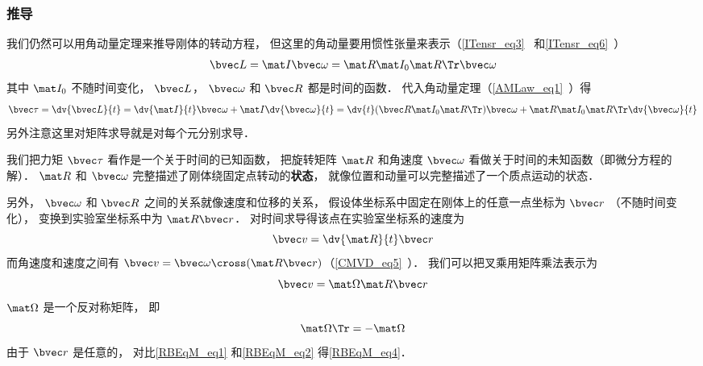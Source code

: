 \subsubsection{推导}
我们仍然可以用角动量定理来推导刚体的转动方程， 但这里的角动量要用惯性张量来表示（\autoref{ITensr_eq3}~ 和\autoref{ITensr_eq6}~）
\begin{equation}
\bvec L = \mat I \bvec \omega = \mat R \mat I_0 \mat R\Tr \bvec \omega
\end{equation}
其中 $\mat I_0$ 不随时间变化， $\bvec L$， $\bvec \omega$ 和 $\bvec R$ 都是时间的函数． 代入角动量定理（\autoref{AMLaw_eq1}~）得
\begin{equation}\label{RBEqM_eq3}
\bvec \tau = \dv{\bvec L}{t} = \dv{\mat I}{t} \bvec\omega + \mat I \dv{\bvec\omega}{t}
= \dv{t} (\bvec R\mat I_0 \mat R\Tr) \bvec \omega + \mat R \mat I_0 \mat R\Tr \dv{\bvec \omega}{t}
\end{equation}
另外注意这里对矩阵求导就是对每个元分别求导．

我们把力矩 $\bvec \tau$ 看作是一个关于时间的已知函数， 把旋转矩阵 $\mat R$ 和角速度 $\bvec \omega$ 看做关于时间的未知函数（即微分方程的解）． $\mat R$ 和 $\bvec \omega$ 完整描述了刚体绕固定点转动的\textbf{状态}， 就像位置和动量可以完整描述了一个质点运动的状态．

另外， $\bvec \omega$ 和 $\bvec R$ 之间的关系就像速度和位移的关系， 假设体坐标系中固定在刚体上的任意一点坐标为 $\bvec r$ （不随时间变化）， 变换到实验室坐标系中为 $\mat R \bvec r$． 对时间求导得该点在实验室坐标系的速度为
\begin{equation}\label{RBEqM_eq1}
\bvec v = \dv{\mat R}{t} \bvec r
\end{equation}
而角速度和速度之间有 $\bvec v = \bvec \omega \cross (\mat R \bvec r)$（\autoref{CMVD_eq5}~）． 我们可以把叉乘用矩阵乘法表示为
\begin{equation}\label{RBEqM_eq2}
\bvec v = \mat\Omega \mat R \bvec r
\end{equation}
$\mat\Omega$ 是一个反对称矩阵， 即
\begin{equation}\label{RBEqM_eq7}
\mat \Omega\Tr = -\mat \Omega
\end{equation}
由于 $\bvec r$ 是任意的， 对比\autoref{RBEqM_eq1} 和\autoref{RBEqM_eq2} 得\autoref{RBEqM_eq4}．


